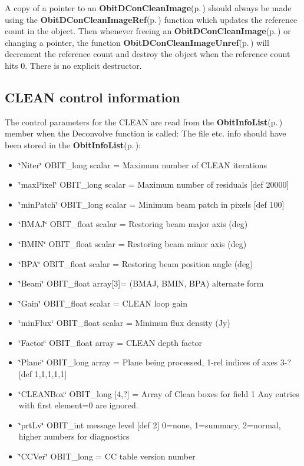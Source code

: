 A copy of a pointer to an {\bf Obit\-DCon\-Clean\-Image}{\rm (p.\,\pageref{structObitDConCleanImage})} should always be made using the {\bf Obit\-DCon\-Clean\-Image\-Ref}{\rm (p.\,\pageref{ObitDConCleanImage_8h_a1})} function which updates the reference count in the object. Then whenever freeing an {\bf Obit\-DCon\-Clean\-Image}{\rm (p.\,\pageref{structObitDConCleanImage})} or changing a pointer, the function {\bf Obit\-DCon\-Clean\-Image\-Unref}{\rm (p.\,\pageref{ObitDConCleanImage_8h_a0})} will decrement the reference count and destroy the object when the reference count hits 0. There is no explicit destructor. \subsection{CLEAN control information}\label{ObitDConCleanImage_8h_ObitDConCleanImagecontrol}
The control parameters for the CLEAN are read from the {\bf Obit\-Info\-List}{\rm (p.\,\pageref{structObitInfoList})} member when the Deconvolve function is called: The file etc. info should have been stored in the {\bf Obit\-Info\-List}{\rm (p.\,\pageref{structObitInfoList})}: \begin{itemize}
\item \char`\"{}Niter\char`\"{} OBIT\_\-long scalar = Maximum number of CLEAN iterations \item \char`\"{}max\-Pixel\char`\"{} OBIT\_\-long scalar = Maximum number of residuals [def 20000] \item \char`\"{}min\-Patch\char`\"{} OBIT\_\-long scalar = Minimum beam patch in pixels [def 100] \item \char`\"{}BMAJ\char`\"{} OBIT\_\-float scalar = Restoring beam major axis (deg) \item \char`\"{}BMIN\char`\"{} OBIT\_\-float scalar = Restoring beam minor axis (deg) \item \char`\"{}BPA\char`\"{} OBIT\_\-float scalar = Restoring beam position angle (deg) \item \char`\"{}Beam\char`\"{} OBIT\_\-float array[3]= (BMAJ, BMIN, BPA) alternate form \item \char`\"{}Gain\char`\"{} OBIT\_\-float scalar = CLEAN loop gain \item \char`\"{}min\-Flux\char`\"{} OBIT\_\-float scalar = Minimun flux density (Jy) \item \char`\"{}Factor\char`\"{} OBIT\_\-float array = CLEAN depth factor \item \char`\"{}Plane\char`\"{} OBIT\_\-long array = Plane being processed, 1-rel indices of axes 3-? [def 1,1,1,1,1] \item \char`\"{}CLEANBox\char`\"{} OBIT\_\-long [4,?] = Array of Clean boxes for field 1 Any entries with first element=0 are ignored. \item \char`\"{}prt\-Lv\char`\"{} OBIT\_\-int message level [def 2] 0=none, 1=summary, 2=normal, higher numbers for diagnostics \item \char`\"{}CCVer\char`\"{} OBIT\_\-long = CC table version number\end{itemize}


